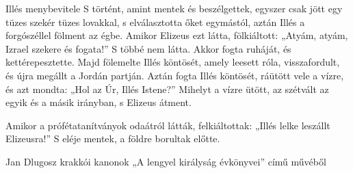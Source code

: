 \documentclass[twoside]{article}
\begin{document}
\begin{lectio}{Illés menybevitele}
S történt, amint mentek és beszélgettek, egyszer csak jött egy tüzes szekér tüzes lovakkal, s elválasztotta őket egymástól, aztán Illés a forgószéllel fölment az égbe. Amikor Elizeus ezt látta, fölkiáltott: „Atyám, atyám, Izrael szekere és fogata!” S többé nem látta. Akkor fogta ruháját, és kettérepesztette. Majd fölemelte Illés köntösét, amely leesett róla, visszafordult, és újra megállt a Jordán partján. Aztán fogta Illés köntösét, ráütött vele a vízre, és azt mondta: „Hol az Úr, Illés Istene?” Mihelyt a vízre ütött, az szétvált az egyik és a másik irányban, s Elizeus átment.

Amikor a prófétatanítványok odaátról látták, felkiáltottak: „Illés lelke leszállt Elizeusra!” S eléje mentek, a földre borultak előtte.
\end{lectio}



Jan Dlugosz krakkói kanonok „A lengyel királyság évkönyvei” című művéből

{\centering{}}
\end{document}
